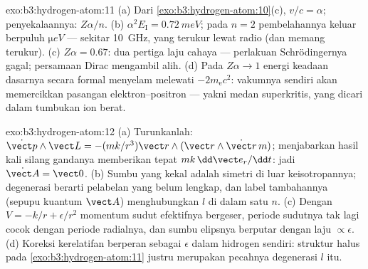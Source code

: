 \begin{solution}{exo:b3:hydrogen-atom:11}
(a) Dari \cref{exo:b3:hydrogen-atom:10}(c), $v/c = \alpha$;
penyekalaannya: $Z\alpha/n$. (b) $\alpha^2E_{\text{I}} = \qty{0.72}{meV}$;
pada $n = 2$ pembelahannya keluar berpuluh $\unit{\micro eV}$ ---
sekitar \qty{10}{GHz}, yang terukur lewat radio (dan memang terukur). (c) $Z\alpha =
0.67$: dua pertiga laju cahaya --- perlakuan Schrödingernya
gagal; persamaan Dirac mengambil alih. (d) Pada $Z\alpha \to 1$ energi
keadaan dasarnya secara formal menyelam melewati $-2m_{\text{e}}c^2$:
vakumnya sendiri akan memercikkan pasangan elektron--positron --- yakni
medan superkritis, yang dicari dalam tumbukan ion berat.
\end{solution}

\begin{solution}{exo:b3:hydrogen-atom:12}
(a) Turunkanlah: $\dot{\vect p}\wedge\vect L = -(mk/r^3)\vect
r\wedge(\vect r\wedge\dot{\vect r}\,m)$; menjabarkan hasil kali silang
gandanya memberikan tepat $mk\,\dd\vect e_r/\dd t$: jadi $\dot{\vect A} =
\vect 0$. (b) Sumbu yang kekal adalah simetri di luar keisotropannya;
degenerasi berarti pelabelan yang belum lengkap, dan label tambahannya
(sepupu kuantum $\vect
A$) menghubungkan $l$ di dalam satu $n$. (c) Dengan
$V = -k/r + \epsilon/r^2$ momentum sudut efektifnya bergeser,
periode sudutnya tak lagi cocok dengan periode radialnya, dan sumbu
elipsnya berputar dengan laju $\propto\epsilon$. (d) Koreksi kerelatifan
berperan sebagai $\epsilon$ dalam hidrogen sendiri: struktur halus pada
\cref{exo:b3:hydrogen-atom:11} justru merupakan pecahnya degenerasi
$l$ itu.
\end{solution}

